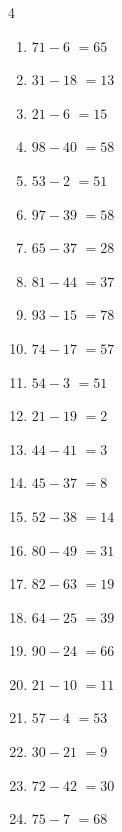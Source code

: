 \begin{multicols}{4}
\begin{enumerate}
  \item $71-6$
        $=65$

  \item $31-18$
        $=13$

  \item $21-6$
        $=15$

  \item $98-40$
        $=58$

  \item $53-2$
        $=51$

  \item $97-39$
        $=58$

  \item $65-37$
        $=28$

  \item $81-44$
        $=37$

  \item $93-15$
        $=78$

  \item $74-17$
        $=57$

  \item $54-3$
        $=51$

  \item $21-19$
        $=2$

  \item $44-41$
        $=3$

  \item $45-37$
        $=8$

  \item $52-38$
        $=14$

  \item $80-49$
        $=31$

  \item $82-63$
        $=19$

  \item $64-25$
        $=39$

  \item $90-24$
        $=66$

  \item $21-10$
        $=11$

  \item $57-4$
        $=53$

  \item $30-21$
        $=9$

  \item $72-42$
        $=30$

  \item $75-7$
        $=68$


\end{enumerate}
\end{multicols}
